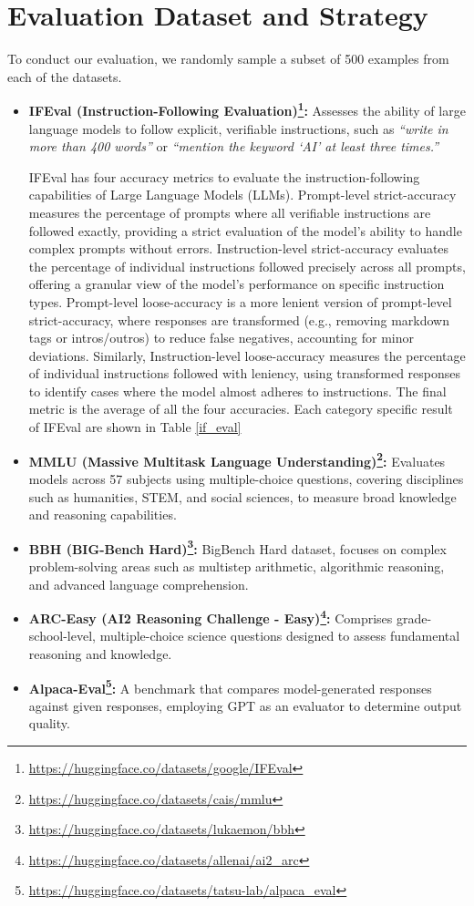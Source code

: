 \section{Evaluation Dataset and Strategy}
\label{Eval Datasets}

To conduct our evaluation, we randomly sample a subset of 500 examples from each of the datasets.

\begin{itemize}
    \setlength{\itemsep}{0.05em} 
    \item \textbf{IFEval (Instruction-Following Evaluation)\footnote{\url{https://huggingface.co/datasets/google/IFEval}}:} Assesses the ability of large language models to follow explicit, verifiable instructions, such as \textit{``write in more than 400 words''} or \textit{``mention the keyword `AI' at least three times.''}
    
    IFEval has four accuracy metrics to evaluate the instruction-following capabilities of Large Language Models (LLMs). Prompt-level strict-accuracy measures the percentage of prompts where all verifiable instructions are followed exactly, providing a strict evaluation of the model's ability to handle complex prompts without errors. Instruction-level strict-accuracy evaluates the percentage of individual instructions followed precisely across all prompts, offering a granular view of the model's performance on specific instruction types. Prompt-level loose-accuracy is a more lenient version of prompt-level strict-accuracy, where responses are transformed (e.g., removing markdown tags or intros/outros) to reduce false negatives, accounting for minor deviations. Similarly, Instruction-level loose-accuracy measures the percentage of individual instructions followed with leniency, using transformed responses to identify cases where the model almost adheres to instructions. The final metric is the average of all the four accuracies. Each category specific result of IFEval are shown in Table \ref{if_eval}

    \item \textbf{MMLU (Massive Multitask Language Understanding)\footnote{\url{https://huggingface.co/datasets/cais/mmlu}}:} Evaluates models across 57 subjects using multiple-choice questions, covering disciplines such as humanities, STEM, and social sciences, to measure broad knowledge and reasoning capabilities.
    \item \textbf{BBH (BIG-Bench Hard)\footnote{\url{https://huggingface.co/datasets/lukaemon/bbh}}:} BigBench Hard dataset, focuses on complex problem-solving areas such as multistep arithmetic, algorithmic reasoning, and advanced language comprehension.
    \item \textbf{ARC-Easy (AI2 Reasoning Challenge - Easy)\footnote{\url{https://huggingface.co/datasets/allenai/ai2_arc}}:} Comprises grade-school-level, multiple-choice science questions designed to assess fundamental reasoning and knowledge.
    \item \textbf{Alpaca-Eval\footnote{\url{https://huggingface.co/datasets/tatsu-lab/alpaca_eval}}:} A benchmark that compares model-generated responses against given responses, employing GPT as an evaluator to determine output quality. 
\end{itemize}

